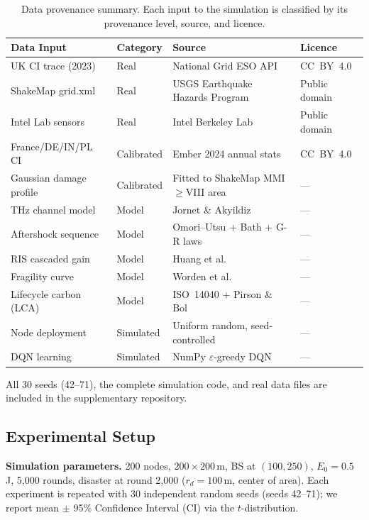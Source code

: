 \begin{table}[!t]
\centering
\caption{Data provenance summary. Each input to the simulation is classified by its provenance level, source, and licence.}
\label{art2:tab:data_provenance}
\renewcommand{\arraystretch}{1.12}
\begin{tabular}{p{2.6cm} l p{3.0cm} l}
\toprule
\textbf{Data Input} & \textbf{Category} & \textbf{Source} & \textbf{Licence} \\
\midrule
UK CI trace (2023) & Real & National Grid ESO API~\cite{uk_carbon_api} & CC~BY~4.0 \\
ShakeMap grid.xml & Real & USGS Earthquake Hazards Program~\cite{worden2005shakemap} & Public domain \\
Intel Lab sensors & Real & Intel Berkeley Lab~\cite{intel_lab_data} & Public domain \\
\midrule
France/DE/IN/PL CI & Calibrated & Ember 2024 annual stats~\cite{ember2024} & CC~BY~4.0 \\
Gaussian damage profile & Calibrated & Fitted to ShakeMap MMI${\geq}$VIII area & --- \\
\midrule
THz channel model & Model & Jornet \& Akyildiz~\cite{jornet2011thz} & --- \\
Aftershock sequence & Model & Omori--Utsu + Bath + G-R laws~\cite{utsu1995omori} & --- \\
RIS cascaded gain & Model & Huang et al.~\cite{huang2021ris} & --- \\
Fragility curve & Model & Worden et al.~\cite{worden2005shakemap} & --- \\
Lifecycle carbon (LCA) & Model & ISO~14040 + Pirson \& Bol~\cite{pirson2021embodied} & --- \\
\midrule
Node deployment & Simulated & Uniform random, seed-controlled & --- \\
DQN learning & Simulated & NumPy $\varepsilon$-greedy DQN & --- \\
\bottomrule
\end{tabular}
\end{table}

All 30 seeds (42--71), the complete simulation code, and real data files are included in the supplementary repository.

\subsection{Experimental Setup}
\label{art2:sec:setup}

\textbf{Simulation parameters.}
200 nodes, $200 \times 200$\,m, BS at $(100, 250)$, $E_0 = 0.5$\,J, 5{,}000 rounds, disaster at round 2{,}000 ($r_d = 100$\,m, center of area).
Each experiment is repeated with 30 independent random seeds (seeds 42--71); we report mean $\pm$ 95\% Confidence Interval (CI) via the $t$-distribution.

